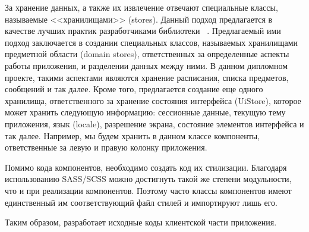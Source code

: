 За хранение данных, а также их извлечение отвечают специальные классы, называемые <<хранилищами>> (stores). Данный подход предлагается в качестве лучших практик разработчиками библиотеки \mobx~\cite{mobx_best_practices}. Предлагаемый ими подход заключается в создании специальных классов, называемых хранилищами предметной области (domain stores), ответственных за определенные аспекты работы приложения, и разделении данных между ними. В данном дипломном проекте, такими аспектами являются хранение расписания, списка предметов, сообщений и так далее. Кроме того, предлагается создание еще одного хранилища, ответственного за хранение состояния интерфейса (UiStore), которое может хранить следующую информацию: сессионные данные, текущую тему приложения, язык (locale), разрешение экрана, состояние элементов интерфейса и так далее. Например, мы будем хранить в данном классе компоненты, ответственные за левую и правую колонку приложения.

Помимо кода компонентов, необходимо создать код их стилизации. Благодаря использованию SASS/SCSS можно достигнуть такой же степени модульности, что и при реализации компонентов. Поэтому часто классы компонентов имеют единственный им соответствующий файл стилей и импортируют лишь его.

Таким образом, разработает исходные коды клиентской части приложения. 
